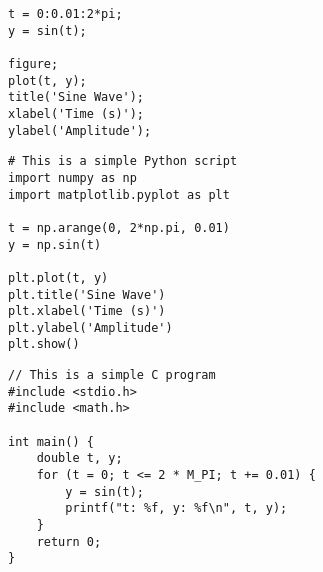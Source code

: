 \begin{lstlisting}[style=MATLAB]
% This is a simple MATLAB script
t = 0:0.01:2*pi;
y = sin(t);

figure;
plot(t, y);
title('Sine Wave');
xlabel('Time (s)');
ylabel('Amplitude');
\end{lstlisting}
\begin{lstlisting}[style=Python]
# This is a simple Python script
import numpy as np
import matplotlib.pyplot as plt

t = np.arange(0, 2*np.pi, 0.01)
y = np.sin(t)

plt.plot(t, y)
plt.title('Sine Wave')
plt.xlabel('Time (s)')
plt.ylabel('Amplitude')
plt.show()
\end{lstlisting}
\begin{lstlisting}[style=C]
// This is a simple C program
#include <stdio.h>
#include <math.h>

int main() {
    double t, y;
    for (t = 0; t <= 2 * M_PI; t += 0.01) {
        y = sin(t);
        printf("t: %f, y: %f\n", t, y);
    }
    return 0;
}
\end{lstlisting}